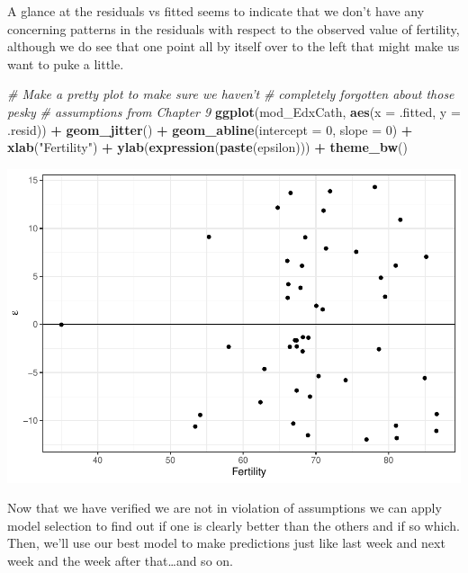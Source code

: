 \documentclass[
]{book}
\newenvironment{Shaded}{\begin{snugshade}}{\end{snugshade}}
\newcommand{\CommentTok}[1]{\textcolor[rgb]{0.56,0.35,0.01}{\textit{#1}}}
\newcommand{\DataTypeTok}[1]{\textcolor[rgb]{0.13,0.29,0.53}{#1}}
\newcommand{\DecValTok}[1]{\textcolor[rgb]{0.00,0.00,0.81}{#1}}
\newcommand{\KeywordTok}[1]{\textcolor[rgb]{0.13,0.29,0.53}{\textbf{#1}}}
\newcommand{\NormalTok}[1]{#1}
\newcommand{\OperatorTok}[1]{\textcolor[rgb]{0.81,0.36,0.00}{\textbf{#1}}}
\newcommand{\StringTok}[1]{\textcolor[rgb]{0.31,0.60,0.02}{#1}}
\begin{document}
A glance at the residuals vs fitted seems to indicate that we don't have any concerning patterns in the residuals with respect to the observed value of fertility, although we do see that one point all by itself over to the left that might make us want to puke a little.

\begin{Shaded}
\begin{Highlighting}[]
\CommentTok{# Make a pretty plot to make sure we haven't}
\CommentTok{# completely forgotten about those pesky}
\CommentTok{# assumptions from Chapter 9}
\KeywordTok{ggplot}\NormalTok{(mod_EdxCath, }\KeywordTok{aes}\NormalTok{(}\DataTypeTok{x =}\NormalTok{ .fitted, }\DataTypeTok{y =}\NormalTok{ .resid)) }\OperatorTok{+}
\StringTok{  }\KeywordTok{geom_jitter}\NormalTok{() }\OperatorTok{+}
\StringTok{  }\KeywordTok{geom_abline}\NormalTok{(}\DataTypeTok{intercept =} \DecValTok{0}\NormalTok{, }\DataTypeTok{slope =} \DecValTok{0}\NormalTok{) }\OperatorTok{+}
\StringTok{  }\KeywordTok{xlab}\NormalTok{(}\StringTok{"Fertility"}\NormalTok{) }\OperatorTok{+}
\StringTok{  }\KeywordTok{ylab}\NormalTok{(}\KeywordTok{expression}\NormalTok{(}\KeywordTok{paste}\NormalTok{(epsilon))) }\OperatorTok{+}
\StringTok{  }\KeywordTok{theme_bw}\NormalTok{()}
\end{Highlighting}
\end{Shaded}

\includegraphics{worstr_files/figure-latex/unnamed-chunk-302-1.pdf}

Now that we have verified we are not in violation of assumptions we can apply model selection to find out if one is clearly better than the others and if so which. Then, we'll use our best model to make predictions just like last week and next week and the week after that\ldots and so on.
\end{document}
